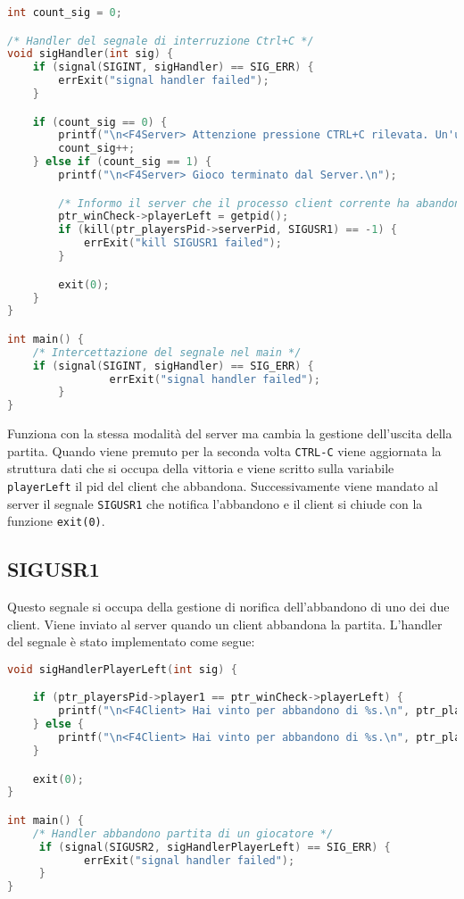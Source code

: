 \documentclass[a4paper,11pt]{article}
\begin{document}
\begin{lstlisting}[language=C]
int count_sig = 0;

/* Handler del segnale di interruzione Ctrl+C */
void sigHandler(int sig) {
    if (signal(SIGINT, sigHandler) == SIG_ERR) {
        errExit("signal handler failed");
    }

    if (count_sig == 0) {
        printf("\n<F4Server> Attenzione pressione CTRL+C rilevata. Un'ulteriore pressione comporta la chiusura del gioco!\n");
        count_sig++;
    } else if (count_sig == 1) {
        printf("\n<F4Server> Gioco terminato dal Server.\n");

        /* Informo il server che il processo client corrente ha abandonato */
        ptr_winCheck->playerLeft = getpid();
        if (kill(ptr_playersPid->serverPid, SIGUSR1) == -1) {
            errExit("kill SIGUSR1 failed");
        }

        exit(0);
    }
}

int main() {
	/* Intercettazione del segnale nel main */
	if (signal(SIGINT, sigHandler) == SIG_ERR) {
        		errExit("signal handler failed");
    	}
}
\end{lstlisting}

Funziona con la stessa modalità del server ma cambia la gestione dell’uscita della partita. Quando viene premuto per la seconda volta \texttt{CTRL-C} viene aggiornata la struttura dati che si occupa della vittoria e viene scritto sulla variabile \texttt{playerLeft} il pid del client che abbandona. Successivamente viene mandato al server il segnale
\texttt{SIGUSR1} che notifica l’abbandono e il client si chiude con la funzione \texttt{exit(0)}.

\subsection{SIGUSR1}

Questo segnale si occupa della gestione di norifica dell'abbandono di uno dei due client. Viene inviato al server quando un client abbandona la partita. L'handler del segnale \`e stato implementato come segue:
\begin{lstlisting}[language=C]
void sigHandlerPlayerLeft(int sig) {

    if (ptr_playersPid->player1 == ptr_winCheck->playerLeft) {
        printf("\n<F4Client> Hai vinto per abbandono di %s.\n", ptr_playersPid->player1Name);
    } else {
        printf("\n<F4Client> Hai vinto per abbandono di %s.\n", ptr_playersPid->player2Name);
    }

    exit(0);
}

int main() {
	/* Handler abbandono partita di un giocatore */
   	 if (signal(SIGUSR2, sigHandlerPlayerLeft) == SIG_ERR) {
         	errExit("signal handler failed");
	 }
}
\end{lstlisting}
\end{document}
